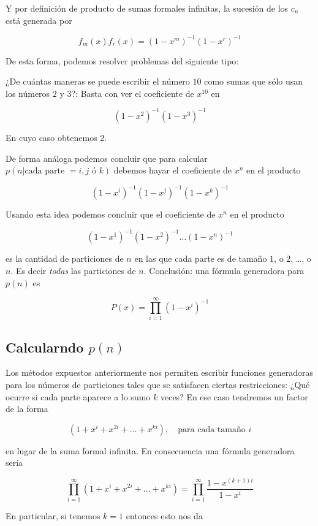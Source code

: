 Y por definición de producto de sumas formales infinitas, la sucesión de los $c_n$ está generada por

\[
f_m(x)f_r(x) = (1-x^m)^{-1}(1-x^r)^{-1}
\]

De esta forma, podemos resolver problemas del siguiente tipo:

\begin{prob}
    ¿De cuántas maneras se puede escribir el número $10$ como sumas que sólo usan los números $2$ y $3$?: Basta con ver el coeficiente de $x^{10}$ en
    
    \[
    (1-x^2)^{-1}(1-x^3)^{-1}
    \]
    
    En cuyo caso obtenemos $2$.
\end{prob}

De forma análoga podemos concluir que para calcular $p(n|\text{cada parte $=i, j$ ó $k$})$ debemos hayar el coeficiente de $x^n$ en el producto 

\[
(1-x^i)^{-1}(1-x^j)^{-1}(1-x^k)^{-1}
\]

Usando esta idea podemos concluir que el coeficiente de $x^n$ en el producto

\[
(1-x^1)^{-1}(1-x^2)^{-1}\dots(1-x^n)^{-1}
\]

\noindent es la cantidad de particiones de $n$ en las que cada parte es de tamaño $1$, o $2$, \dots, o $n$. Es decir \textit{todas} las particiones de $n$. Conclusión: una fórmula generadora para $p(n)$ es

\[
P(x) = \prod_{i=1}^{\infty} (1-x^i)^{-1}
\]

\subsection{Calcularndo $p(n)$}

Los métodos expuestos anteriormente nos permiten escribir funciones generadoras para los números de particiones tales que se satisfacen ciertas restricciones: ¿Qué ocurre si cada parte aparece a lo sumo $k$ veces? En ese caso tendremos un factor de la forma

\[
(1 + x^i + x^{2i} + \dots + x^{ki}), \quad \text{para cada tamaño $i$}
\]

\noindent en lugar de la suma formal infinita. En consecuencia una fórmula generadora sería

\[
\prod_{i=1}^{\infty} (1 + x^i + x^{2i} + \dots + x^{ki}) = \prod_{i=1}^{\infty} \frac{1 - x^{(k+1)i}}{1-x^i}
\]

En particular, si tenemos $k=1$ entonces esto nos da


